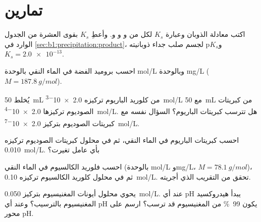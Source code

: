 \section{تمارين}

\begin{exercise}[$\star$]\label{exo:b1:precipitation:1}
اكتب معادلة الذوبان وعبارة $K_s$ لكل من
 و و و. وأعطِ $K_s$ بقوى
العشرة من الجدول الوارد في \cref{sec:b1:precipitation:product}، و$\mathrm{p}K_s$
لجسم صلب جداء ذوبانيته $K_s = \num{2.0e-13}$.
\end{exercise}

\begin{exercise}[$\star$]\label{exo:b1:precipitation:2}
احسب  بروميد الفضة في الماء النقي بالوحدة \unit{mol/L}
وبالوحدة \unit{mg/L} ($M = \qty{187.8}{g/mol}$).
\end{exercise}

\begin{exercise}[$\star$]\label{exo:b1:precipitation:3}
يُخلط \qty{50}{mL} من كلوريد الباريوم تركيزه \qty{2.0e-3}{mol/L} مع
\qty{50}{mL} من كبريتات الصوديوم تركيزها \qty{2.0e-4}{mol/L}. هل تترسب
كبريتات الباريوم؟ السؤال نفسه مع كبريتات الصوديوم بتركيز
\qty{2.0e-7}{mol/L}.
\end{exercise}

\begin{exercise}[$\star$]\label{exo:b1:precipitation:4}
احسب  كبريتات الباريوم في الماء النقي، ثم في
محلول كبريتات الصوديوم تركيزه \qty{0.010}{mol/L}. بأي عامل
تغيرت؟
\end{exercise}

\begin{exercise}[$\star\star$]\label{exo:b1:precipitation:5}
احسب  فلوريد الكالسيوم في الماء النقي (بالوحدة \unit{mol/L}
و\unit{mg/L}، $M = \qty{78.1}{g/mol}$)، ثم في محلول كلوريد
الكالسيوم تركيزه \qty{0.10}{mol/L}. تحقق من التقريب الذي أجريته.
\end{exercise}

\begin{exercise}[$\star\star$]\label{exo:b1:precipitation:6}
يحوي محلول أيونات المغنيسيوم بتركيز \qty{0.050}{mol/L}. عند أي pH يبدأ
هيدروكسيد المغنيسيوم بالترسيب؟ وعند أي pH يكون \qty{99}{\percent} من
المغنيسيوم قد ترسب؟ ارسم   على
محور pH.
\end{exercise}

